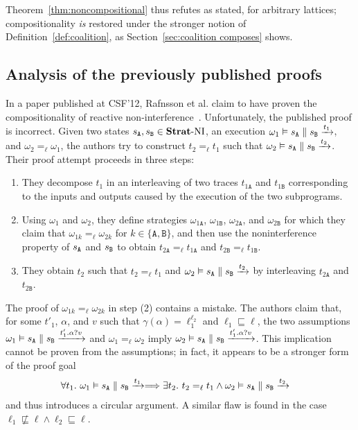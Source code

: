 \documentclass[preprint,5p,twocolumn]{elsarticle}
\begin{document}
Theorem~\ref{thm:noncompositional} thus refutes \cite[Theorem V.1]{Rafnsson2012} as stated, for
arbitrary lattices; compositionality \emph{is} restored under the stronger notion of
Definition~\ref{def:coalition}, as Section~\ref{sec:coalition composes} shows.

\subsection{Analysis of the previously published proofs}
\label{sec:flawed proof}

In a paper published at CSF'12, Rafnsson et al. claim to
have proven the compositionality of reactive non-interference~\cite[p. 301-302]{Rafnsson2012}.
Unfortunately, the published proof is incorrect.
Given two states $s_{\mathtt{A}}, s_{\mathtt{B}} \in \mathbf{Strat}\text{-}\mathrm{NI}$,
an execution $\omega_1 \vDash s_{\mathtt{A}} \parallel s_{\mathtt{B}} \xrightarrow{t_1}$, and $\omega_2 =_\ell \omega_1$, the authors try to construct
$t_2 =_\ell t_1$ such that $\omega_2 \vDash s_{\mathtt{A}} \parallel s_{\mathtt{B}} \xrightarrow{t_2}$. Their proof attempt proceeds in three
steps:
\begin{enumerate}
\item They decompose $t_1$ in an interleaving of two traces $t_{1\mathtt{A}}$ and $t_{1\mathtt{B}}$ corresponding
  to the inputs and outputs caused by the execution of the two subprograms.
\item Using $\omega_1$ and $\omega_2$,
  they define strategies $\omega_{1\mathtt{A}}$, $\omega_{1\mathtt{B}}$, $\omega_{2\mathtt{A}}$, and $\omega_{2\mathtt{B}}$
  for which they claim that $\omega_{1k} =_\ell \omega_{2k}$ for $k \in \{\mathtt{A},\mathtt{B}\}$, and then use
  the noninterference property of $s_{\mathtt{A}}$ and $s_{\mathtt{B}}$ to obtain $t_{2\mathtt{A}} =_\ell t_{1\mathtt{A}}$ and $t_{2\mathtt{B}} =_\ell t_{1\mathtt{B}}$.
\item They obtain $t_2$ such that $t_2 =_\ell t_1$ and $\omega_2 \vDash s_{\mathtt{A}} \parallel s_{\mathtt{B}} \xrightarrow{t_2}$ by
  interleaving $t_{2\mathtt{A}}$ and $t_{2\mathtt{B}}$.
\end{enumerate}
The proof of $\omega_{1k} =_\ell \omega_{2k}$ in step (2) contains a mistake. The authors claim that, for some $t'_1$,
$\alpha$, and $v$ such that $\gamma(\alpha)=\ell_1^{\ell_2}$ and $\ell_1 \sqsubseteq \ell$,
the two assumptions $\omega_1 \vDash s_{\mathtt{A}} \parallel s_{\mathtt{B}} \xrightarrow{t'_1.\alpha?v}$ and $\omega_1 =_\ell \omega_2$ 
imply $\omega_2 \vDash s_{\mathtt{A}} \parallel s_{\mathtt{B}} \xrightarrow{t'_1.\alpha?v}$. This implication cannot be proven from the
assumptions; in fact, it appears to be a stronger form of the proof goal
\begin{align*}
  \forall t_1.~&\omega_1 \vDash s_{\mathtt{A}} \parallel s_{\mathtt{B}} \xrightarrow{t_1}\Longrightarrow \exists t_2.~t_2 =_\ell t_1 \wedge \omega_2 \vDash s_{\mathtt{A}} \parallel s_{\mathtt{B}} \xrightarrow{t_2}
\end{align*}
and thus introduces a circular argument. A similar flaw is found in the case $\ell_1 \not\sqsubseteq \ell \wedge \ell_2 \sqsubseteq \ell$.
\end{document}
